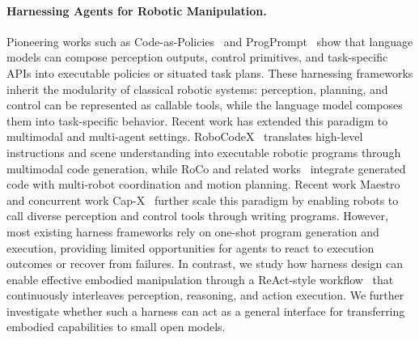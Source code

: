 \paragraph{Harnessing Agents for Robotic Manipulation.}
Pioneering works such as Code-as-Policies~\citep{liang2022codeap} and ProgPrompt~\citep{singh2023progprompt} show that language models can compose perception outputs, control primitives, and task-specific APIs into executable policies or situated task plans. 
These harnessing frameworks inherit the modularity of classical robotic systems: perception, planning, and control can be represented as callable tools, while the language model composes them into task-specific behavior. 
Recent work has extended this paradigm to multimodal and multi-agent settings. 
RoboCodeX~\citep{mu2024robocodex} translates high-level instructions and scene understanding into executable robotic programs through multimodal code generation, while RoCo and related works~\citep{mandi2024roco,chen2025emos} integrate generated code with multi-robot coordination and motion planning. 
Recent work Maestro~\citep{shi2025maestro} and concurrent work Cap-X~\citep{fu2026capxframeworkbenchmarkingimproving} further scale this paradigm by enabling robots to call diverse perception and control tools through writing programs.
However, most existing harness frameworks rely on one-shot program generation and execution, providing limited opportunities for agents to react to execution outcomes or recover from failures.
In contrast, we study how harness design can enable effective embodied manipulation through a ReAct-style workflow~\citep{yao2023reactsynergizingreasoningacting} that continuously interleaves perception, reasoning, and action execution. 
We further investigate whether such a harness can act as a general interface for transferring embodied capabilities to small open models.
